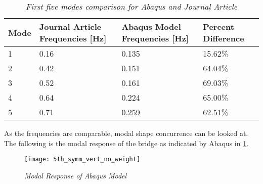 \begin{table}
\begin{tabular}{|l|l|l|l|}
\hline
Mode &  Journal Article Frequencies [Hz] & Abaqus Model Frequencies [Hz]  & Percent Difference   \\
\hline
1    & 0.16                          & 0.135                              & 15.62\%                \\
2    & 0.42                          & 0.151                           	  & 64.04\%                \\
3    & 0.52                          & 0.161                              & 69.03\%              \\
4    & 0.64                          & 0.224                              & 65.00\%            \\
5    & 0.71                          & 0.259                              & 62.51\%          \\
\hline
\end{tabular}
\caption{\textit{First five modes comparison for Abaqus and Journal Article}}
\label{tab:FirstFive}
\end{table}

As the frequencies are comparable, modal shape concurrence can be looked at. The following is the modal response of the bridge as indicated by Abaqus in \ref{fig:ABAQUS_Chris}. 

\begin{figure}[h]
\centering
\texttt{[image: 5th\_symm\_vert\_no\_weight]}
\caption{\textit{Modal Response of Abaqus Model}}
\label{fig:ABAQUS_Chris}
\end{figure}
